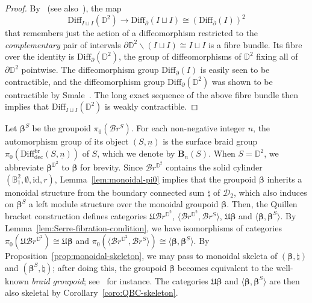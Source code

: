 \documentclass[AHL,Unicode,published]{cedram}
\newcommand{\Diff}{\mathrm{Diff}}
\newcommand{\id}{\mathrm{id}}
\newcommand{\rdec}{\mathrm{dec}}
\newcommand{\B}{\ensuremath{\mathbf{B}}}
\newcommand{\fU}{\ensuremath{\mathfrak{U}}}
\newcommand{\cB}{\mathcal{B}}
\newcommand{\cD}{\mathcal{D}}
\newcommand{\bB}{\mathbb{B}}
\newcommand{\bD}{\mathbb{D}}
\newcommand{\too}{\ensuremath{\longrightarrow}}
\newcommand{\diffdecbr}{\ensuremath{\mathrm{Diff}_{\rdec}^{\mathrm{br}}}}
\newcommand{\Beta}{\boldsymbol{\beta}}
\begin{document}
\begin{proof}
By~\cite[\S~II.2.2.2, Cor.~2]{Cerf1961Topologiedecertains} (see also~\cite{Palais1960Localtrivialityof,Lima1963localtrivialityof}), the map
\[
\Diff_{I \sqcup I}(\bD^{2}) \too \Diff_\partial(I \sqcup I) \cong (\Diff_\partial(I))^2
\]
that remembers just the action of a diffeomorphism restricted to the \emph{complementary} pair of intervals $\partial \bD^{2} \smallsetminus (I \sqcup I) \cong I \sqcup I$ is a fibre bundle. Its fibre over the identity is $\Diff_\partial(\bD^{2})$, the group of diffeomorphisms of $\bD^{2}$ fixing all of $\partial \bD^{2}$ pointwise. The diffeomorphism group $\Diff_\partial(I)$ is easily seen to be contractible, and the diffeomorphism group $\Diff_\partial(\bD^{2})$ was shown to be contractible by Smale~\cite{Smale1959}. The long exact sequence of the above fibre bundle then implies that $\Diff_{I \sqcup I}(\bD^{2})$ is weakly contractible.
\end{proof}

Let $\Beta^{S}$ be the groupoid $\pi_{0}(\cB r^{S})$. For each non-negative integer $n$, the automorphism group of its object $(S,\underline{n})$ is the surface braid group $\pi_{0}(\diffdecbr(S,\underline{n}))$ of $S$, which we denote by $\B_{n}(S)$. When $S=\bD^{2}$, we abbreviate $\Beta^{\bD^{2}}$ to $\Beta$ for brevity. Since $\cB r^{\bD^{2}}$ contains the solid cylinder $(\bB^2_{1},\emptyset,\id,r)$, Lemma~\ref{lem:monoidal-pi0} implies that the groupoid $\Beta$ inherits a monoidal structure from the boundary connected sum $\natural$ of $\cD_{2}$, which also induces on $\Beta^{S}$ a left module structure over the monoidal groupoid $\Beta$. Then, the Quillen bracket construction defines categories $\fU\cB r^{\bD^{2}}$, $\langle\cB r^{\bD^{2}},\cB r^{S}\rangle$, $\fU\Beta$ and $\langle \Beta,\Beta^{S}\rangle $. By Lemma~\ref{lem:Serre-fibration-condition}, we have isomorphisms of categories $\pi_{0}(\fU\cB r^{\bD^{2}}) \cong \fU\Beta$ and $\pi_{0}(\langle\cB r^{\bD^{2}},\cB r^{S}\rangle) \cong \langle \Beta,\Beta^{S}\rangle$. By Proposition~\ref{prop:monoidal-skeleton}, we may pass to monoidal skeleta of $(\Beta,\natural)$ and $(\Beta^{S},\natural)$; after doing this, the groupoid $\Beta$ becomes equivalent to the well-known \emph{braid groupoid}; see~\cite[Chap.~XI, \S~4]{MacLane1} for instance. The categories $\fU\Beta$ and $\langle \Beta,\Beta^{S}\rangle$ are then also skeletal by Corollary~\ref{coro:QBC-skeleton}.
\end{document}
